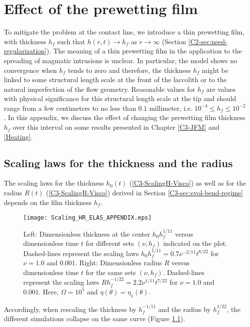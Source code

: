 \chapter{Effect of the prewetting film}
\label{chap:A3}

To  mitigate the  problem at  the contact  line, we  introduce a  thin
prewetting     film,     with     thickness    $h_f$     such     that
$h(r,t)\rightarrow    h_f$   as    $r\rightarrow   \infty$    (Section
\ref{C2-sec:need-regularization}).  The  meaning of a  thin prewetting
film in  the application  to the spreading  of magmatic  intrusions is
unclear.  In  particular, the  model shows  no convergence  when $h_f$
tends to zero \citep{Lister:2013ia} and therefore, the thickness $h_f$
might be  linked to some structural  length scale at the  front of the
laccolith  or  to  the  natural imperfection  of  the  flow  geometry.
Reasonable values for $h_f$ are  values with physical significance for
this structural  length scale at the  tip and should range  from a few
centimeters    to    no    less   than    $0.1$    millimeter,    i.e.
$10^{-4}\le h_f \le 10^{-2}$ . In this appendix, we discuss the effect
of changing the prewetting film  thickness $h_f$ over this interval on
some results presented in Chapter \ref{C3-JFM} and \ref{Heating}.

\section{Scaling laws for the thickness and the radius}

The scaling laws for  the thickness $h_0(t)$ (\ref{C3-ScalingH-Visco})
as well as for the  radius $R(t)$ (\ref{C3-ScalingR-Visco}) derived in
Section  \ref{C3-sec:evol-bend-regime} depends  on the  film thickness
$h_f$.
\begin{figure}[h!]
  \begin{center}
    \graphicspath{ {/Users/thorey/Documents/These/Projet/Refroidissement/Skin_Model/Figure/JFM_V13/} }
    \texttt{[image: Scaling\_HR\_ELAS\_APPENDIX.eps]}
    \caption{Left:    Dimensionless    thickness   at    the    center
      $h_0h_f^{1/11}$ versus dimensionless time $t$ for different sets
      $(\nu,h_f)$ indicated  on the plot.  Dashed-lines  represent the
      scaling   laws   $h_0h_f^{1/11}=   0.7\nu^{-2/11}t^{8/22}$   for
      $\nu = 1.0$ and $0.001$.  Right: Dimensionless radius $R$ versus
      dimensionless   time  $t$   for  the   same  sets   $(\nu,h_f)$.
      Dashed-lines       represent        the       scaling       laws
      $Rh_f^{-1/22}=  2.2\nu^{1/11}t^{7/22}$  for   $\nu  =  1.0$  and
      $0.001$.          Here,        $\Omega=         10^5$        and
      $\eta(\theta)=\eta_1(\theta)$.}
    \label{Scaling_HR_ELAS_APPENDIX}
  \end{center}
\end{figure}
Accordingly,  when rescaling  the thickness  by $h_f^{-1/11}$  and the
radius by $h_f^{1/22}$, the different simulations collapse on the same
curve (Figure \ref{Scaling_HR_ELAS_APPENDIX}).

